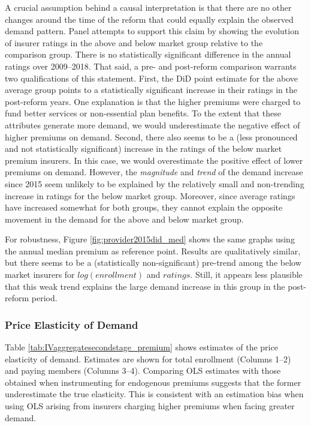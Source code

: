 \documentclass[a4paper, 11pt, english]{article}
\begin{document}
A crucial assumption behind a causal interpretation is that there are no other changes around the time of the reform that could equally explain the observed demand pattern. Panel  attempts to support this claim by showing the evolution of insurer ratings in the above and below market group relative to the comparison group. There is no statistically significant difference in the annual ratings over 2009--2018. That said, a pre- and post-reform comparison warrants two qualifications of this statement. First, the DiD point estimate for the above average group points to a statistically significant increase in their ratings in the post-reform years. One explanation is that the higher premiums were charged to fund better services or non-essential plan benefits. To the extent that these attributes generate more demand, we would underestimate the negative effect of higher premiums on demand. Second, there also seems to be a (less pronounced and not statistically significant) increase in the ratings of the below market premium insurers. In this case, we would overestimate the positive effect of lower premiums on demand. However, the \textit{magnitude} and \textit{trend} of the demand increase since 2015 seem unlikely to be explained by the relatively small and non-trending increase in ratings for the below market group. Moreover, since average ratings have increased somewhat for both groups, they cannot explain the opposite movement in the demand for the above and below market group.

For robustness, Figure \ref{fig:provider2015did_med} shows the same graphs using the annual median premium as reference point. Results are qualitatively similar, but there seems to be a (statistically non-significant) pre-trend among the below market insurers for $log(enrollment)$ and $ratings$. Still, it appears less plausible that this weak trend explains the large demand increase in this group in the post-reform period.


\subsubsection*{Price Elasticity of Demand}

Table \ref{tab:IVaggregatesecondstage_premium} shows estimates of the price elasticity of demand. Estimates are shown for total enrollment (Columns 1--2) and paying members (Columns 3--4). Comparing OLS estimates with those obtained when instrumenting for endogenous premiums suggests that the former underestimate the true elasticity. This is consistent with an estimation bias when using OLS arising from insurers charging higher premiums when facing greater demand. 
\end{document}
